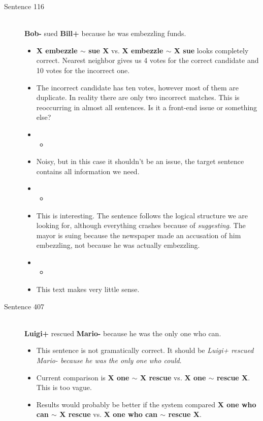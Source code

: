 \documentclass{scrartcl}
\newcommand{\insertcode}[2]{\begin{itemize}\item[]\end{itemize}} %
\begin{document}
\begin{description}
  \item[Sentence 116] \hfill \\
  {\bf Bob-} sued {\bf Bill+} because he was embezzling funds. 
  \begin{itemize}
  	\item {\bf X embezzle $\sim$ sue X} vs. {\bf X embezzle $\sim$ X sue} looks completely correct. Nearest neighbor gives us 4 votes for the correct candidate and 10 votes for the incorrect one.
  	\item The incorrect candidate has ten votes, however most of them are duplicate. In reality there are only two incorrect matches. This is reoccurring in almost all sentences. Is it a front-end issue or something else?
  	\item \insertcode{"Scripts/116/116-1.sentence"}{Context of first incorrect vote.}
  	\item Noisy, but in this case it shouldn't be an issue, the target sentence contains all information we need.
  	\item \insertcode{"Scripts/116/116-2.sentence"}{Target sentence of first incorrect vote.}
  	\item This is interesting. The sentence follows the logical structure we are looking for, although everything crashes because of {\it suggesting}. The mayor is suing because the newspaper made an accusation of him embezzling, not because he was actually embezzling.
  	\item \insertcode{"Scripts/116/116-3.sentence"}{Context for remaining votes.}
  	\item  This text makes very little sense.
  \end{itemize}

  \item[Sentence 407] \hfill \\
  {\bf Luigi+} rescued {\bf Mario-} because he was the only one who can.
  \begin{itemize}
  	\item This sentence is not gramatically correct. It should be {\it Luigi+ rescued Mario- because he was the only one who could}.
  	\item Current comparison is {\bf X one $\sim$ X rescue} vs. {\bf X one $\sim$ rescue X}. This is too vague.
  	\item Results would probably be better if the system compared {\bf X one who can $\sim$ X rescue} vs. {\bf X one who can $\sim$ rescue X}.
  \end{itemize}


\end{description}
\end{document}
